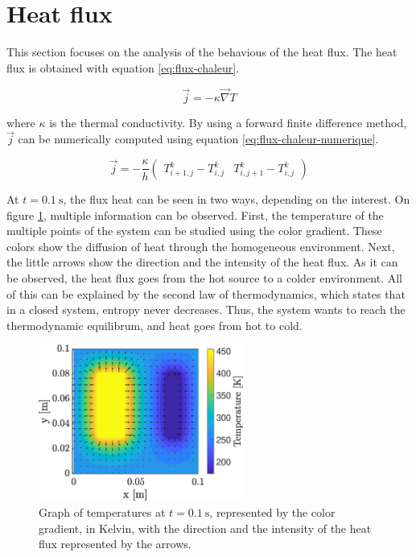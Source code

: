 \documentclass[a4paper,12pt,twoside]{article}
\begin{document}
\section{Heat flux}
This section focuses on the analysis of the behavious of the heat flux.
The heat flux is obtained with equation \eqref{eq:flux-chaleur}.

\begin{equation}
  \vec{j} = -\kappa\vec{\nabla} T
  \label{eq:flux-chaleur}
\end{equation}

where $\kappa$ is the thermal conductivity.
By using a forward finite difference method, $\vec{j}$ can be numerically computed using equation \eqref{eq:flux-chaleur-numerique}.

\begin{equation}
  \vec{j} = -\frac{\kappa}{h}
  \begin{pmatrix}
    T^k_{i+1,j} - T^k_{i,j} & T^k_{i,j+1} - T^k_{i,j}
  \end{pmatrix}
  \label{eq:flux-chaleur-numerique}
\end{equation}

At $t=\SI{0.1}{\s}$, the flux heat can be seen in two ways, depending on the interest.
On figure \ref{fig:c-temp}, multiple information can be observed.
First, the temperature of the multiple points of the system can be studied using the color gradient.
These colors show the diffusion of heat through the homogeneous environment.
Next, the little arrows show the direction and the intensity of the heat flux.
As it can be observed, the heat flux goes from the hot source to a colder environment.
All of this can be explained by the second law of thermodynamics, which states that in a closed system, entropy never decreases. \cite{wiki:2nd-law}
Thus, the system wants to reach the thermodynamic equilibrum, and heat goes from hot to cold. %


\begin{figure}[h]
  \centering
  \includegraphics[width=0.6\textwidth]{graphs/c_temp.eps}
  \caption{Graph of temperatures at $t=\SI{0.1}{\s}$, represented by the color gradient, in Kelvin, with the direction and the intensity of the heat flux represented by the arrows.}
  \label{fig:c-temp}
\end{figure}
\end{document}
